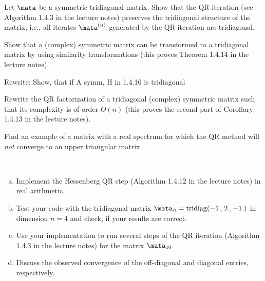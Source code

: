 
\begin{Sheet}
  \label{sheet4}

  \begin{Problem}
    Let $\mata$ be a symmetric tridiagonal matrix. Show that the
    QR-iteration (see Algorithm 1.4.3 in the lecture notes) preserves
    the tridiagonal structure of the matrix, i.e., all iterates
    $\mata^{(n)}$ generated by the QR-iteration are tridiagonal.
  \end{Problem}

  \begin{Problem}
    Show that a (complex) symmetric matrix can be transformed to a
    tridiagonal matrix by using similarity transformations (this
    proves Theorem 1.4.14 in the lecture notes).
    \begin{todo}
      Rewrite: Show, that if A symm, H in 1.4.16 is tridiagonal
    \end{todo}
  \end{Problem}

  \begin{Problem}
    Rewrite the QR factorization of a tridiagonal (complex) symmetric
    matrix such that its complexity is of order $O(n)$ (this proves
    the second part of Corollary 1.4.13 in the lecture notes).
  \end{Problem}

  \begin{Problem}
    Find an example of a matrix with a real spectrum for which the QR
    method will \textit{not} converge to an upper triangular matrix.
  \end{Problem}

  \begin{Problem}[Programming]
    \hfill\\\vspace{-6ex}
    \begin{enumerate}[(a)]
    \item Implement the Hessenberg QR step (Algorithm 1.4.12 in the
      lecture notes) in real arithmetic.
    \item Test your code with the tridiagonal matrix
      $\mata_n=\operatorname{tridiag}(-1.,2.,-1.)$ in dimension $n=4$
      and check, if your results are correct.
    \item Use your implementation to run several steps of the QR
      iteration (Algorithm 1.4.3 in the lecture notes) for the matrix
      $\mata_{10}$.
    \item Discuss the observed convergence of the off-diagonal and
      diagonal entries, respectively.
    \end{enumerate}
  \end{Problem}

\end{Sheet}


